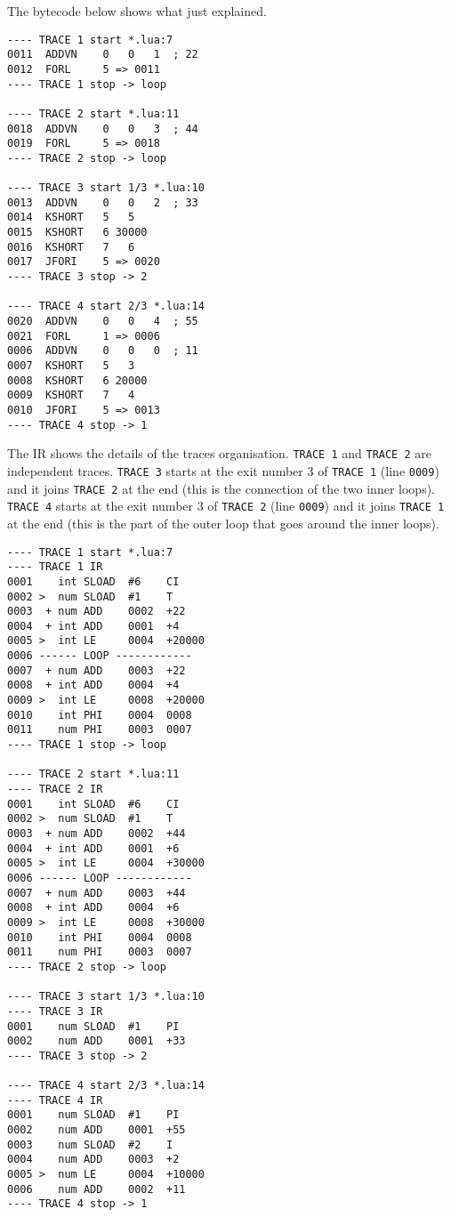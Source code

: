 The bytecode below shows what just explained.

\begin{multicols}{2}
\begin{lstlisting}[style=DumpStyle]
---- TRACE 1 start *.lua:7
0011  ADDVN    0   0   1  ; 22
0012  FORL     5 => 0011
---- TRACE 1 stop -> loop

---- TRACE 2 start *.lua:11
0018  ADDVN    0   0   3  ; 44
0019  FORL     5 => 0018
---- TRACE 2 stop -> loop

---- TRACE 3 start 1/3 *.lua:10
0013  ADDVN    0   0   2  ; 33
0014  KSHORT   5   5
0015  KSHORT   6 30000
0016  KSHORT   7   6
0017  JFORI    5 => 0020
---- TRACE 3 stop -> 2

---- TRACE 4 start 2/3 *.lua:14
0020  ADDVN    0   0   4  ; 55
0021  FORL     1 => 0006
0006  ADDVN    0   0   0  ; 11
0007  KSHORT   5   3
0008  KSHORT   6 20000
0009  KSHORT   7   4
0010  JFORI    5 => 0013
---- TRACE 4 stop -> 1
\end{lstlisting}
\end{multicols}

\newpage
\noindent
The IR shows the details of the traces organisation. \texttt{TRACE 1} and \texttt{TRACE 2} are independent traces. \texttt{TRACE 3} starts at the exit number 3 of \texttt{TRACE 1} (line \texttt{0009}) and it joins \texttt{TRACE 2} at the end (this is the connection of the two inner loops). \texttt{TRACE 4} starts at the exit number 3 of \texttt{TRACE 2} (line \texttt{0009}) and it joins \texttt{TRACE 1} at the end (this is the part of the outer loop that goes around the inner loops).

\begin{multicols}{2}
\begin{lstlisting}[style=DumpStyle]
---- TRACE 1 start *.lua:7
---- TRACE 1 IR
0001    int SLOAD  #6    CI
0002 >  num SLOAD  #1    T
0003  + num ADD    0002  +22 
0004  + int ADD    0001  +4  
0005 >  int LE     0004  +20000
0006 ------ LOOP ------------
0007  + num ADD    0003  +22 
0008  + int ADD    0004  +4  
0009 >  int LE     0008  +20000
0010    int PHI    0004  0008
0011    num PHI    0003  0007
---- TRACE 1 stop -> loop

---- TRACE 2 start *.lua:11
---- TRACE 2 IR
0001    int SLOAD  #6    CI
0002 >  num SLOAD  #1    T
0003  + num ADD    0002  +44 
0004  + int ADD    0001  +6  
0005 >  int LE     0004  +30000
0006 ------ LOOP ------------
0007  + num ADD    0003  +44 
0008  + int ADD    0004  +6  
0009 >  int LE     0008  +30000
0010    int PHI    0004  0008
0011    num PHI    0003  0007
---- TRACE 2 stop -> loop

---- TRACE 3 start 1/3 *.lua:10
---- TRACE 3 IR
0001    num SLOAD  #1    PI
0002    num ADD    0001  +33 
---- TRACE 3 stop -> 2

---- TRACE 4 start 2/3 *.lua:14
---- TRACE 4 IR
0001    num SLOAD  #1    PI
0002    num ADD    0001  +55 
0003    num SLOAD  #2    I
0004    num ADD    0003  +2  
0005 >  num LE     0004  +10000
0006    num ADD    0002  +11 
---- TRACE 4 stop -> 1
\end{lstlisting}
\end{multicols}

